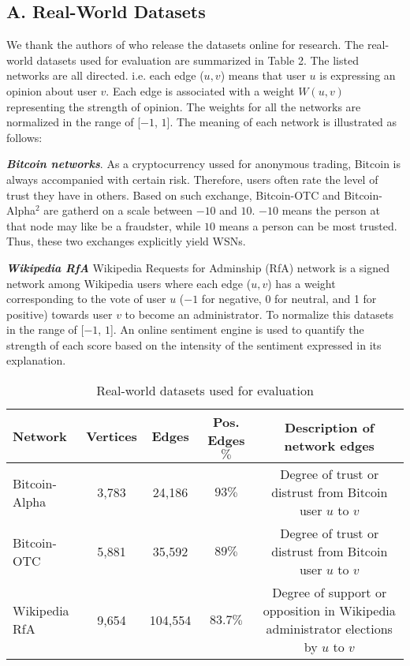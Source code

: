 
\subsection*{A. Real-World Datasets}
We thank the authors of \cite{kumar2016edge} who release the datasets online for research.
The real-world datasets used for evaluation are summarized in Table 2.
The listed networks are all directed. i.e. each edge ($u,v$) means that user
$u$ is expressing an opinion about user $v$. Each edge is associated with a
weight $W(u,v)$ representing the strength of opinion. The weights for all 
the networks are normalized in the range of [$-1$, $1$]. The meaning 
of each network is illustrated as follows:

\emph{\textbf{Bitcoin networks}}. As a cryptocurrency ussed for 
anonymous trading, Bitcoin is always accompanied with certain risk.
Therefore, users often rate the level of trust they have in others.
Based on such exchange, Bitcoin-OTC and Bitcoin-Alpha$^2$ are gatherd
on a scale between $-10$ and $10$. $-10$ means the person at that node 
may like be a fraudster, while $10$ means a person can be most trusted.
Thus, these two exchanges explicitly yield WSNs.

\emph{\textbf{Wikipedia RfA}} Wikipedia Requests for Adminship (RfA) 
network is a signed network among Wikipedia users where each 
edge ($u,v$) has a weight corresponding to the vote of user $u$
($-1$ for negative, 0 for neutral, and 1 for positive) towards user 
$v$ to become an administrator. To normalize this datasets in the
range of [$-1$, $1$]. An online sentiment engine is used to quantify
the strength of each score based on the intensity of the sentiment expressed 
in its explanation.

\begin{table}[htbp]
\centering
\caption{Real-world datasets used for evaluation}
  \begin{tabular}{l|c|c|c|c}
  \toprule
  \textbf{Network}& \textbf{Vertices} & \textbf{Edges} & \textbf{Pos. Edges $\%$} & \textbf{Description of network edges} \\ \hline
  Bitcoin-Alpha         & 3,783 & 24,186 & $93\%$  & Degree of trust or distrust from Bitcoin user $u$ to $v$ \\ \hline
  Bitcoin-OTC           & 5,881 & 35,592 & $89\%$  & Degree of trust or distrust from Bitcoin user $u$ to $v$ \\ \hline
  Wikipedia RfA         & 9,654 & 104,554 & $83.7\%$  & Degree of support or opposition in Wikipedia administrator elections by $u$ to $v$ \\ \hline
  \end{tabular}
\end{table}

